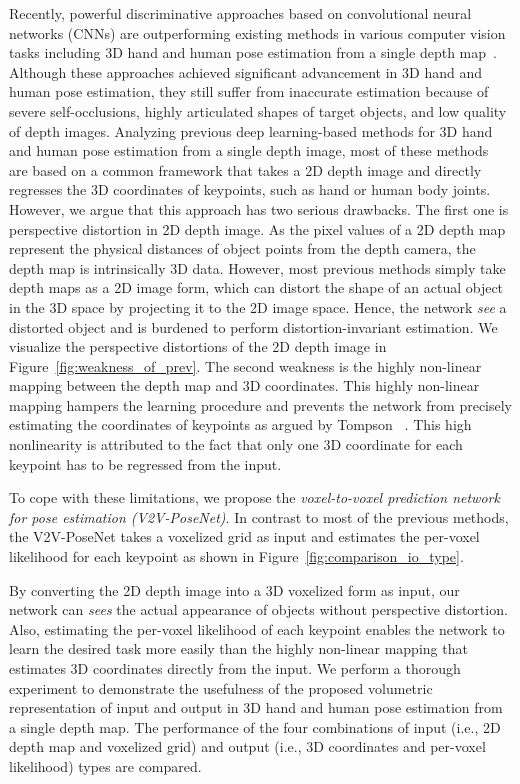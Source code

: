 Recently, powerful discriminative approaches based on convolutional neural networks (CNNs) are outperforming existing methods in various computer vision tasks including 3D hand and human pose estimation from a single depth map~\cite{ge20173d,guo2017towards,Oberweger_2017_ICCV_Workshops,chen2017pose,haque2016towards}. Although these approaches achieved significant advancement in 3D hand and human pose estimation, they still suffer from inaccurate estimation because of severe self-occlusions, highly articulated shapes of target objects, and low quality of depth images. Analyzing previous deep learning-based methods for 3D hand and human pose estimation from a single depth image, most of these methods~\cite{oberweger2015hands,oberweger2015training,bouchacourt2016disco,Wan_2017_CVPR,guo2017ren,guo2017towards,Oberweger_2017_ICCV_Workshops,chen2017pose,madadi2017end,fourure2017multi,haque2016towards} are based on a common framework that takes a 2D depth image and directly regresses the 3D coordinates of keypoints, such as hand or human body joints. However, we argue that this approach has two serious drawbacks. The first one is perspective distortion in 2D depth image. As the pixel values of a 2D depth map represent the physical distances of object points from the depth camera, the depth map is intrinsically 3D data. However, most previous methods simply take depth maps as a 2D image form, which can distort the shape of an actual object in the 3D space by projecting it to the 2D image space. Hence, the network \emph{see} a distorted object and is burdened to perform distortion-invariant estimation. We visualize the perspective distortions of the 2D depth image in Figure~\ref{fig:weakness_of_prev}. The second weakness is the highly non-linear mapping between the depth map and 3D coordinates. This highly non-linear mapping hampers the learning procedure and prevents the network from precisely estimating the coordinates of keypoints as argued by Tompson \etal~\cite{tompson2014joint}. This high nonlinearity is attributed to the fact that only one 3D coordinate for each keypoint has to be regressed from the input.

To cope with these limitations, we propose the \emph{voxel-to-voxel prediction network for pose estimation (V2V-PoseNet)}. In contrast to most of the previous methods, the V2V-PoseNet takes a voxelized grid as input and estimates the per-voxel likelihood for each keypoint as shown in Figure~\ref{fig:comparison_io_type}. 

By converting the 2D depth image into a 3D voxelized form as input, our network can \emph{sees} the actual appearance of objects without perspective distortion. Also, estimating the per-voxel likelihood of each keypoint enables the network to learn the desired task more easily than the highly non-linear mapping that estimates 3D coordinates directly from the input. We perform a thorough experiment to demonstrate the usefulness of the proposed volumetric representation of input and output in 3D hand and human pose estimation from a single depth map. The performance of the four combinations of input (i.e., 2D depth map and voxelized grid) and output (i.e., 3D coordinates and per-voxel likelihood) types are compared.

